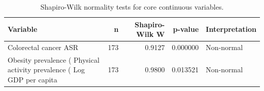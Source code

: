 \begin{table}
\centering
\caption{Shapiro-Wilk normality tests for core continuous variables.}
\label{tab:shapiro_wilk_tests}
\begin{tabular}{lrrrl}
\toprule
                        Variable &   n &  Shapiro-Wilk W &  p-value & Interpretation \\
\midrule
           Colorectal cancer ASR & 173 &          0.9127 & 0.000000 &     Non-normal \\
          Obesity prevalence (%
Physical activity prevalence (%
              Log GDP per capita & 173 &          0.9800 & 0.013521 &     Non-normal \\
\bottomrule
\end{tabular}
\end{table}
